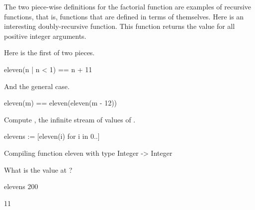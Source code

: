 The two piece-wise definitions for the factorial function
are examples of recursive functions, that is, functions that
are defined in terms of themselves.
Here is an interesting doubly-recursive function.
This function returns the value  for all positive integer arguments.
\begin{xtc}
\begin{xtccomment}
Here is the first of two pieces.
\end{xtccomment}
\begin{spadsrc}
eleven(n | n < 1) == n + 11
\end{spadsrc}
\end{xtc}
\begin{xtc}
\begin{xtccomment}
And the general case.
\end{xtccomment}
\begin{spadsrc}
eleven(m) == eleven(eleven(m - 12))
\end{spadsrc}
\end{xtc}
\begin{xtc}
\begin{xtccomment}
Compute , the infinite stream
of values of .
\end{xtccomment}
\begin{spadsrc}
elevens := [eleven(i) for i in 0..]
\end{spadsrc}
\begin{MessageOutput}
   Compiling function eleven with type Integer -> Integer 
\end{MessageOutput}
\begin{TeXOutput}
\begin{fricasmath}{10}
%
\end{fricasmath}
\end{TeXOutput}
\end{xtc}
\begin{xtc}
\begin{xtccomment}
What is the value at ?
\end{xtccomment}
\begin{spadsrc}
elevens 200
\end{spadsrc}
\begin{TeXOutput}
\begin{fricasmath}{11}
11%
\end{fricasmath}
\end{TeXOutput}
\end{xtc}
